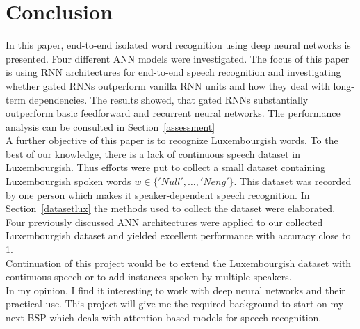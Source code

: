 
\section{Conclusion}

In this paper, end-to-end isolated word recognition using deep neural networks
is presented. Four different ANN models were investigated. The focus of this
paper is using RNN architectures for end-to-end speech recognition and
investigating whether gated RNNs outperform vanilla RNN units and how they deal
with long-term dependencies. The results showed, that gated RNNs substantially
outperform basic feedforward and recurrent neural networks. The performance
analysis can be consulted in Section~\ref{assessment}\\

A further objective of this paper is to recognize Luxembourgish words. To the
best of our knowledge, there is a lack of continuous speech dataset in
Luxembourgish. Thus efforts were put to collect a small dataset containing
Luxembourgish spoken words $w \in \{'Null',\dots,'Neng'\}$. This dataset was
recorded by one person which makes it speaker-dependent speech recognition. In
Section~\ref{datasetlux} the methods used to collect the dataset were
elaborated. Four previously discussed ANN architectures were applied to our
collected Luxembourgish dataset and yielded excellent performance with accuracy
close to 1.\\

Continuation of this project would be to extend the Luxembourgish dataset with
continuous speech or to add instances spoken by multiple speakers.\\

In my opinion, I find it interesting to work with deep neural networks and their
practical use. This project will give me the required background to start on my
next BSP which deals with attention-based models for speech recognition.
